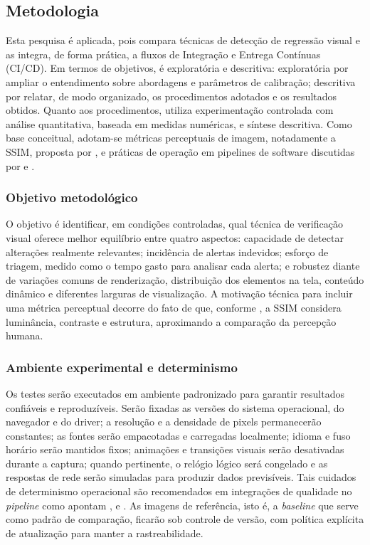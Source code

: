 \documentclass{UNESC}
\begin{document}
\subsection{Metodologia}
Esta pesquisa é aplicada, pois compara técnicas de detecção de regressão visual e as integra, de forma prática, a fluxos de Integração e Entrega Contínuas (CI/CD). Em termos de objetivos, é exploratória e descritiva: exploratória por ampliar o entendimento sobre abordagens e parâmetros de calibração; descritiva por relatar, de modo organizado, os procedimentos adotados e os resultados obtidos. Quanto aos procedimentos, utiliza experimentação controlada com análise quantitativa, baseada em medidas numéricas, e síntese descritiva. Como base conceitual, adotam-se métricas perceptuais de imagem, notadamente a SSIM, proposta por , e práticas de operação em pipelines de software discutidas por  e .

\subsubsection{Objetivo metodológico}
O objetivo é identificar, em condições controladas, qual técnica de verificação visual oferece melhor equilíbrio entre quatro aspectos: capacidade de detectar alterações realmente relevantes; incidência de alertas indevidos; esforço de triagem, medido como o tempo gasto para analisar cada alerta; e robustez diante de variações comuns de renderização, distribuição dos elementos na tela, conteúdo dinâmico e diferentes larguras de visualização. A motivação técnica para incluir uma métrica perceptual decorre do fato de que, conforme , a SSIM considera luminância, contraste e estrutura, aproximando a comparação da percepção humana.

\subsubsection{Ambiente experimental e determinismo}
Os testes serão executados em ambiente padronizado para garantir resultados confiáveis e reproduzíveis. Serão fixadas as versões do sistema operacional, do navegador e do driver; a resolução e a densidade de pixels permanecerão constantes; as fontes serão empacotadas e carregadas localmente; idioma e fuso horário serão mantidos fixos; animações e transições visuais serão desativadas durante a captura; quando pertinente, o relógio lógico será congelado e as respostas de rede serão simuladas para produzir dados previsíveis. Tais cuidados de determinismo operacional são recomendados em integrações de qualidade no \emph{pipeline} como apontam ,  e . As imagens de referência, isto é, a \emph{baseline} que serve como padrão de comparação, ficarão sob controle de versão, com política explícita de atualização para manter a rastreabilidade.
\end{document}
